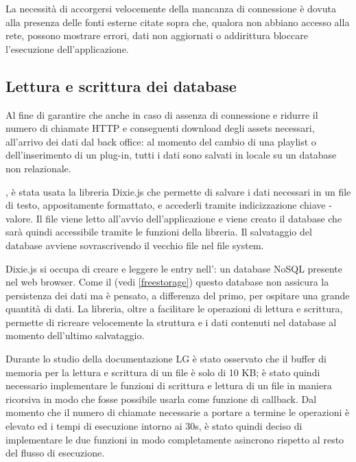 La necessità di accorgersi velocemente della mancanza di connessione è dovuta alla presenza delle fonti esterne citate sopra che, qualora non abbiano accesso alla rete, possono mostrare errori, dati non aggiornati o addirittura bloccare l'esecuzione dell'applicazione.

\subsection{Lettura e scrittura dei database} \label{database}

Al fine di garantire che anche in caso di assenza di connessione e ridurre il numero di chiamate HTTP e conseguenti download degli assets necessari, all'arrivo dei dati dal back office: al momento del cambio di una playlist o dell'inserimento di un plug-in, tutti i dati sono salvati in locale su un database non relazionale.

, è stata usata la libreria Dixie.js \cite{dixie} che permette di salvare i dati necessari in un file di testo, appositamente formattato, e accederli tramite indicizzazione chiave - valore. Il file viene letto all'avvio dell'applicazione e viene creato il database che sarà quindi accessibile tramite le funzioni della libreria. Il salvataggio del database avviene sovrascrivendo il vecchio file nel file system.

Dixie.js si occupa di creare e leggere le entry nell': un database NoSQL presente nel web browser. Come il  (vedi \ref*{freestorage}) questo database non assicura la persistenza dei dati ma è pensato, a differenza del primo, per ospitare una grande quantità di dati. La libreria, oltre a facilitare le operazioni di lettura e scrittura, permette di ricreare velocemente la struttura e i dati contenuti nel database al momento dell'ultimo salvataggio.

Durante lo studio della documentazione LG è stato osservato che il buffer di memoria per la lettura e scrittura di un file è solo di 10 KB; è stato quindi necessario implementare le funzioni di scrittura e lettura di un file in maniera ricorsiva in modo che fosse possibile usarla come funzione di callback.
Dal momento che il numero di chiamate necessarie a portare a termine le operazioni è elevato ed i tempi di esecuzione intorno ai 30s, è stato quindi deciso di implementare le due funzioni in modo completamente asincrono rispetto al resto del flusso di esecuzione. 

